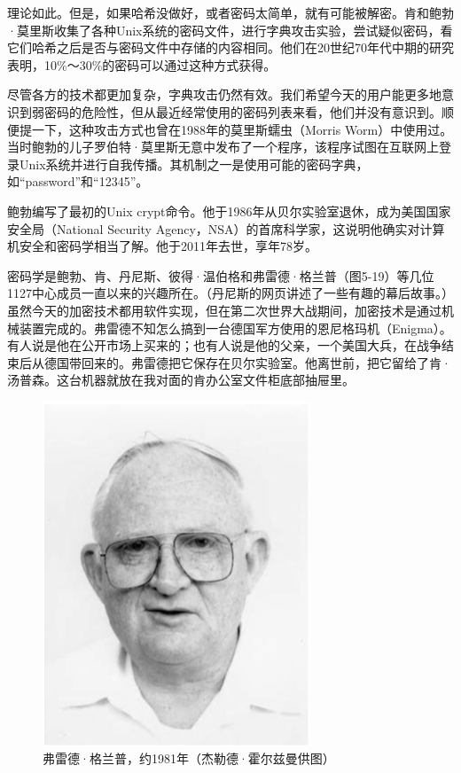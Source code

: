 \documentclass[a4paper,12pt,UTF8,twoside]{ctexbook}
\begin{document}
理论如此。但是，如果哈希没做好，或者密码太简单，就有可能被解密。肯和鲍勃·莫里斯收集了各种Unix系统的密码文件，进行字典攻击实验，尝试疑似密码，看它们哈希之后是否与密码文件中存储的内容相同。他们在20世纪70年代中期的研究表明，10\%～30\%的密码可以通过这种方式获得。

尽管各方的技术都更加复杂，字典攻击仍然有效。我们希望今天的用户能更多地意识到弱密码的危险性，但从最近经常使用的密码列表来看，他们并没有意识到。顺便提一下，这种攻击方式也曾在1988年的莫里斯蠕虫（Morris Worm）中使用过。当时鲍勃的儿子罗伯特·莫里斯无意中发布了一个程序，该程序试图在互联网上登录Unix系统并进行自我传播。其机制之一是使用可能的密码字典，如“password”和“12345”。

鲍勃编写了最初的Unix crypt命令。他于1986年从贝尔实验室退休，成为美国国家安全局（National Security Agency，NSA）的首席科学家，这说明他确实对计算机安全和密码学相当了解。他于2011年去世，享年78岁。

密码学是鲍勃、肯、丹尼斯、彼得·温伯格和弗雷德·格兰普（图5-19）等几位1127中心成员一直以来的兴趣所在。（丹尼斯的网页讲述了一些有趣的幕后故事。）虽然今天的加密技术都用软件实现，但在第二次世界大战期间，加密技术是通过机械装置完成的。弗雷德不知怎么搞到一台德国军方使用的恩尼格玛机（Enigma）。有人说是他在公开市场上买来的；也有人说是他的父亲，一个美国大兵，在战争结束后从德国带回来的。弗雷德把它保存在贝尔实验室。他离世前，把它留给了肯·汤普森。这台机器就放在我对面的肯办公室文件柜底部抽屉里。

\begin{figure}[htbp]
	\centering
	\includegraphics[width=0.7\linewidth]{58}
	\caption{弗雷德·格兰普，约1981年（杰勒德·霍尔兹曼供图）}
	\label{fig:1}
\end{figure}
\end{document}
